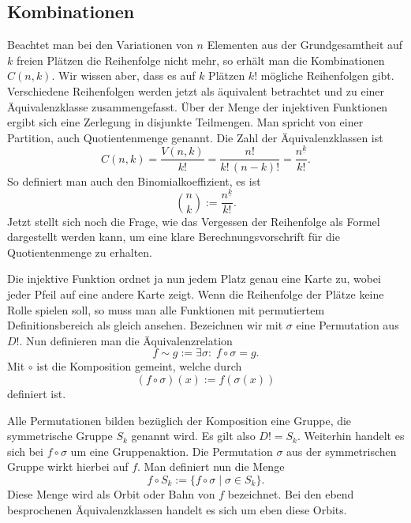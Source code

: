 \documentclass[a4paper,12pt,fleqn]{article}
\begin{document}
\subsection{Kombinationen}
Beachtet man bei den Variationen von $n$ Elementen aus der
Grundgesamtheit auf $k$ freien Plätzen die Reihenfolge nicht mehr,
so erhält man die Kombinationen $C(n,k)$. Wir wissen aber, dass
es auf $k$ Plätzen $k!$ mögliche Reihenfolgen gibt. Verschiedene
Reihenfolgen werden jetzt als äquivalent betrachtet und zu
einer Äquivalenzklasse zusammengefasst. Über der Menge der
injektiven Funktionen ergibt sich eine Zerlegung in disjunkte
Teilmengen. Man spricht von einer Partition, auch Quotientenmenge
genannt. Die Zahl der Äquivalenzklassen ist
\begin{equation}
C(n,k) = \frac{V(n,k)}{k!} = \frac{n!}{k!\,(n-k)!}
= \frac{n^{\underline k}}{k!}.
\end{equation}
So definiert man auch den Binomialkoeffizient, es ist
\begin{equation}
\binom{n}{k} := \frac{n^{\underline k}}{k!}.
\end{equation}
Jetzt stellt sich noch die Frage, wie das Vergessen der Reihenfolge
als Formel dargestellt werden kann, um eine klare
Berechnungsvorschrift für die Quotientenmenge zu erhalten.

Die injektive Funktion ordnet ja nun jedem Platz genau eine Karte
zu, wobei jeder Pfeil auf eine andere Karte zeigt. Wenn die
Reihenfolge der Plätze keine Rolle spielen soll, so muss man
alle Funktionen mit permutiertem Definitionsbereich als gleich
ansehen. Bezeichnen wir mit $\sigma$ eine Permutation
aus $D!$. Nun definieren man die Äquivalenzrelation
\begin{equation}
f\sim g  := \exists \sigma{:}\; f\circ\sigma = g.
\end{equation}
Mit $\circ$ ist die Komposition gemeint, welche durch
\begin{equation}
(f\circ \sigma)(x) := f(\sigma(x))
\end{equation}
definiert ist.

Alle Permutationen bilden bezüglich der Komposition eine Gruppe,
die symmetrische Gruppe $S_k$ genannt wird. Es gilt also
$D!=S_k$. Weiterhin handelt es sich bei $f\circ\sigma$ um eine
Gruppenaktion. Die Permutation $\sigma$ aus der symmetrischen
Gruppe wirkt hierbei auf $f$. Man definiert nun die Menge
\[f\circ S_k := \{f\circ\sigma\;|\;\sigma\in S_k\}.\]
Diese Menge wird als Orbit oder Bahn von $f$ bezeichnet.
Bei den ebend besprochenen Äquivalenzklassen handelt es sich
um eben diese Orbits.
\end{document}
